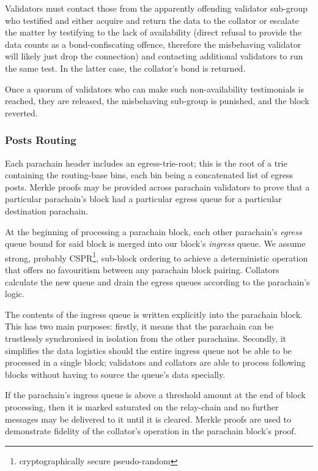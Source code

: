 \documentclass[usepdftitle=false]{beamer}
\begin{document}
\begin{frame}
 Validators must contact those from the apparently offending validator sub-group who testified and either acquire and return the data to the collator or escalate the matter by testifying to the lack of availability (direct refusal to provide the data counts as a bond-confiscating offence, therefore the misbehaving validator will likely just drop the connection) and contacting additional validators to run the same test. In the latter case, the collator's bond is returned.

 Once a quorum of validators who can make such non-availability testimonials is reached, they are released, the misbehaving sub-group is punished, and the block reverted.

\subsubsection{Posts Routing}
\label{posts-routing}

 Each parachain header includes an egress-trie-root; this is the root of a trie containing the routing-base bins, each bin being a concatenated list of egress posts. Merkle proofs may be provided across parachain validators to prove that a particular parachain's block had a particular egress queue for a particular destination parachain.

 At the beginning of processing a parachain block, each other parachain's \textit{egress} queue bound for said block is merged into our block's \textit{ingress} queue. We assume strong, probably CSPR\footnote{cryptographically secure pseudo-random}, sub-block ordering to achieve a deterministic operation that offers no favouritism between any parachain block pairing. Collators calculate the new queue and drain the egress queues according to the parachain's logic.

 The contents of the ingress queue is written explicitly into the parachain block. This has two main purposes: firstly, it means that the parachain can be trustlessly synchronised in isolation from the other parachains. Secondly, it simplifies the data logistics should the entire ingress queue not be able to be processed in a single block; validators and collators are able to process following blocks without having to source the queue's data specially.

 If the parachain's ingress queue is above a threshold amount at the end of block processing, then it is marked saturated on the relay-chain and no further messages may be delivered to it until it is cleared. Merkle proofs are used to demonstrate fidelity of the collator's operation in the parachain block's proof.


\end{frame}
\end{document}
